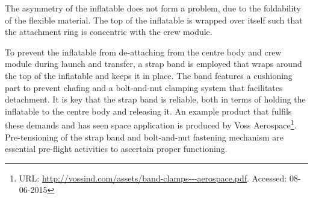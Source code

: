 The asymmetry of the inflatable does not form a problem, due to the foldability of the flexible material. The top of the inflatable is wrapped over itself such that the attachment ring is concentric with the crew module. 

To prevent the inflatable from de-attaching from the centre body and crew module during launch and transfer, a strap band is employed that wraps around the top of the inflatable and keeps it in place. The band features a cushioning part to prevent chafing and a bolt-and-nut clamping system that facilitates detachment. It is key that the strap band is reliable, both in terms of holding the inflatable to the centre body and releasing it. An example product that fulfils these demands and has seen space application is produced by Voss Aerospace\footnote{URL: \url{http://vossind.com/assets/band-clamps---aerospace.pdf}. Accessed: 08-06-2015}. Pre-tensioning of the strap band and bolt-and-nut fastening mechanism are essential pre-flight activities to ascertain proper functioning.

